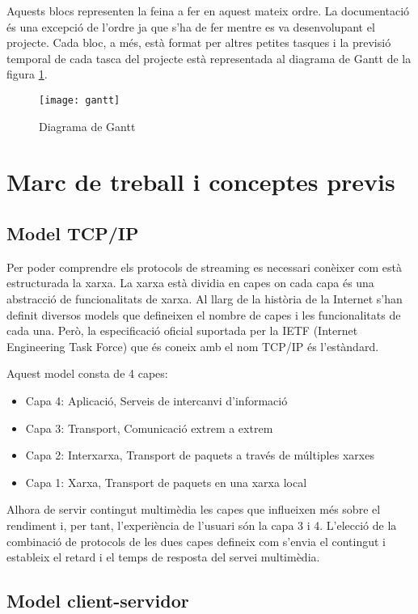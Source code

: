 \documentclass[12pt, titlepage]{article}
\begin{document}
Aquests blocs representen la feina a fer en aquest mateix ordre. La documentació
és una excepció de l'ordre ja que s'ha de fer mentre es va desenvolupant el projecte.
Cada bloc, a més, està format per altres petites tasques i la previsió temporal
de cada tasca del projecte està representada al diagrama de Gantt de la figura
\ref{gantt}.

\begin{figure}[H]
\centering
\texttt{[image: gantt]}
\caption{Diagrama de Gantt}
\label{gantt}
\end{figure}

\section{Marc de treball i conceptes previs}
\subsection{Model TCP/IP}
Per poder comprendre els protocols de streaming es necessari conèixer com està
estructurada la xarxa. La xarxa està dividia en capes on cada capa és una abstracció
de funcionalitats de xarxa. Al llarg de la història de la Internet s'han definit
diversos models que defineixen el nombre de capes i les funcionalitats de cada
una. Però, la especificació oficial suportada per la IETF (Internet Engineering
Task Force) que és coneix amb el nom TCP/IP és l'estàndard.

Aquest model consta de 4 capes:
\begin{itemize}
\item Capa 4: Aplicació, Serveis de intercanvi d'informació
\item Capa 3: Transport, Comunicació extrem a extrem
\item Capa 2: Interxarxa, Transport de paquets a través de múltiples xarxes
\item Capa 1: Xarxa, Transport de paquets en una xarxa local
\end{itemize}
Alhora de servir contingut multimèdia les capes que influeixen més sobre el
rendiment i, per tant, l'experiència de l'usuari són la capa 3 i 4. L'elecció
de la combinació de protocols de les dues capes defineix com s'envia el contingut
i estableix el retard i el temps de resposta del servei multimèdia.

\subsection{Model client-servidor}
\end{document}
